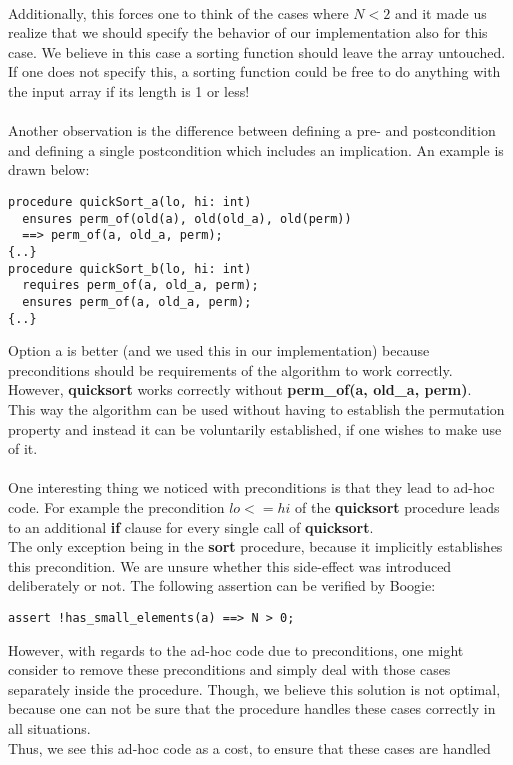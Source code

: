 \documentclass{report}
\begin{document}
\\
Additionally, this forces one to think of the cases where $N < 2$ and it made us realize that we should specify the behavior of our implementation also for this case. We believe in this case a sorting function should leave the array untouched. If one does not specify this, a sorting function could be free to do anything with the input array if its length is 1 or less!
\\\\
Another observation is the difference between defining a pre- and postcondition and defining a single postcondition which includes an implication.
An example is drawn below:
\begin{lstlisting}
procedure quickSort_a(lo, hi: int)
  ensures perm_of(old(a), old(old_a), old(perm)) 
  ==> perm_of(a, old_a, perm);
{..}
procedure quickSort_b(lo, hi: int)
  requires perm_of(a, old_a, perm);
  ensures perm_of(a, old_a, perm);
{..}
\end{lstlisting}
Option a is better (and we used this in our implementation) because preconditions should be requirements of the algorithm to work correctly.
However, \textbf{quicksort} works correctly without \textbf{perm\_of(a, old\_a, perm)}.
\\
This way the algorithm can be used without having to establish the permutation property
and instead it can be voluntarily established, if one wishes to make use of it.
\\\\
One interesting thing we noticed with preconditions is that they lead to ad-hoc code.
For example the precondition $lo <= hi$ of the \textbf{quicksort} procedure leads to
an additional \textbf{if} clause for every single call of \textbf{quicksort}.\\
The only exception being in the \textbf{sort} procedure, because it implicitly
establishes this precondition. We are unsure whether this side-effect was
introduced deliberately or not. The following assertion can be verified by Boogie:
\begin{lstlisting}
assert !has_small_elements(a) ==> N > 0;
\end{lstlisting}
However, with regards to the ad-hoc code due to preconditions, one might consider
to remove these preconditions and simply deal with those cases separately inside
the procedure. Though, we believe this solution is not optimal, because one can not
be sure that the procedure handles these cases correctly in all situations.\\
Thus, we see this ad-hoc code as a cost, to ensure that these cases are handled
\end{document}
